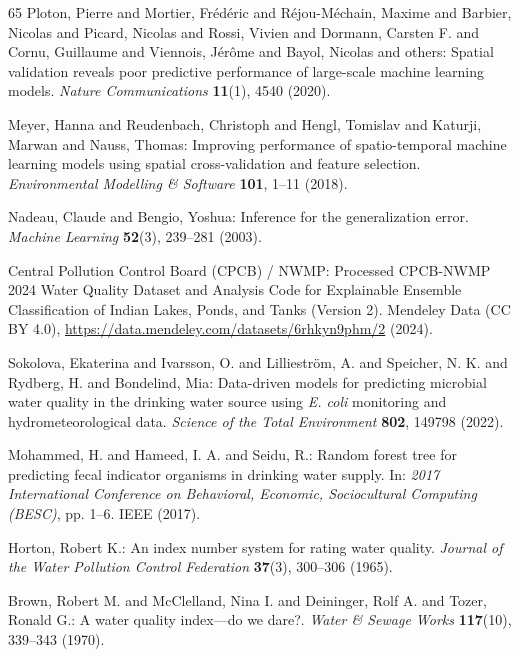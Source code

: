 \documentclass[pdflatex,sn-mathphys-num]{sn-jnl}%
\theoremstyle{thmstyleone}%
\theoremstyle{thmstyletwo}%
\theoremstyle{thmstylethree}%
\begin{document}
\begin{thebibliography}{65}
Ploton, Pierre and Mortier, Fr{\'e}d{\'e}ric and R{\'e}jou-M{\'e}chain, Maxime and Barbier, Nicolas and Picard, Nicolas and Rossi, Vivien and Dormann, Carsten F. and Cornu, Guillaume and Viennois, J{\'e}r{\^o}me and Bayol, Nicolas and others: Spatial validation reveals poor predictive performance of large-scale machine learning models.
\textit{Nature Communications} \textbf{11}(1), 4540 (2020).

Meyer, Hanna and Reudenbach, Christoph and Hengl, Tomislav and Katurji, Marwan and Nauss, Thomas: Improving performance of spatio-temporal machine learning models using spatial cross-validation and feature selection.
\textit{Environmental Modelling \& Software} \textbf{101}, 1--11 (2018).

Nadeau, Claude and Bengio, Yoshua: Inference for the generalization error.
\textit{Machine Learning} \textbf{52}(3), 239--281 (2003).

Central Pollution Control Board (CPCB) / NWMP: Processed CPCB-NWMP 2024 Water Quality Dataset and Analysis Code for Explainable Ensemble Classification of Indian Lakes, Ponds, and Tanks (Version 2).
Mendeley Data (CC BY 4.0), \url{https://data.mendeley.com/datasets/6rhkyn9phm/2} (2024).

Sokolova, Ekaterina and Ivarsson, O. and Lilliestr{\"o}m, A. and Speicher, N. K. and Rydberg, H. and Bondelind, Mia: Data-driven models for predicting microbial water quality in the drinking water source using \textit{E. coli} monitoring and hydrometeorological data.
\textit{Science of the Total Environment} \textbf{802}, 149798 (2022).

Mohammed, H. and Hameed, I. A. and Seidu, R.: Random forest tree for predicting fecal indicator organisms in drinking water supply.
In: \textit{2017 International Conference on Behavioral, Economic, Sociocultural Computing (BESC)}, pp. 1--6. IEEE (2017).

Horton, Robert K.: An index number system for rating water quality.
\textit{Journal of the Water Pollution Control Federation} \textbf{37}(3), 300--306 (1965).

Brown, Robert M. and McClelland, Nina I. and Deininger, Rolf A. and Tozer, Ronald G.: A water quality index---do we dare?.
\textit{Water \& Sewage Works} \textbf{117}(10), 339--343 (1970).


\end{thebibliography}
\end{document}
